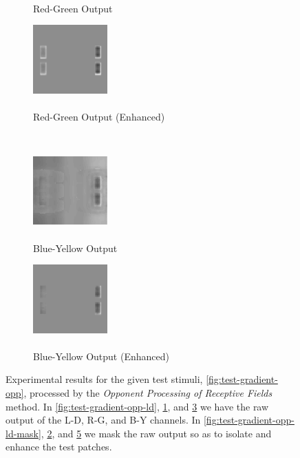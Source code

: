 \documentclass[journal,onecolumn]{IEEEtran}
\begin{document}
{\begin{figure}[H]
\begin{subfigure}[b]{0.5\textwidth}
            \caption{\\ Red-Green Output}
            \label{fig:test-gradient-opp-rg}
    \end{subfigure}%
    \begin{subfigure}[b]{0.5\textwidth}
            \centering
            \includegraphics[width=108px, frame]{test-gradient-opp-rg-mask}
            \caption{\\ Red-Green Output (Enhanced)}
            \label{fig:test-gradient-opp-rg-mask}
    \end{subfigure}\\
    \begin{subfigure}[b]{0.5\textwidth}
            \centering
            \includegraphics[width=108px, frame]{test-gradient-opp-by}
            \caption{\\ Blue-Yellow Output}
            \label{fig:test-gradient-opp-by}
    \end{subfigure}%
    \begin{subfigure}[b]{0.5\textwidth}
            \centering
            \includegraphics[width=108px, frame]{test-gradient-opp-by-mask}
            \caption{\\ Blue-Yellow Output (Enhanced)}
            \label{fig:test-gradient-opp-by-mask}
    \end{subfigure}
    \caption{Experimental results for the given test stimuli, \ref{fig:test-gradient-opp}, processed by the \textit{Opponent Processing of Receptive Fields} method. In \ref{fig:test-gradient-opp-ld}, \ref{fig:test-gradient-opp-rg}, and \ref{fig:test-gradient-opp-by} we have the raw output of the L-D, R-G, and B-Y channels. In \ref{fig:test-gradient-opp-ld-mask}, \ref{fig:test-gradient-opp-rg-mask}, and \ref{fig:test-gradient-opp-by-mask} we mask the raw output so as to isolate and enhance the test patches.}
\end{figure}
\clearpage
}
\end{document}
